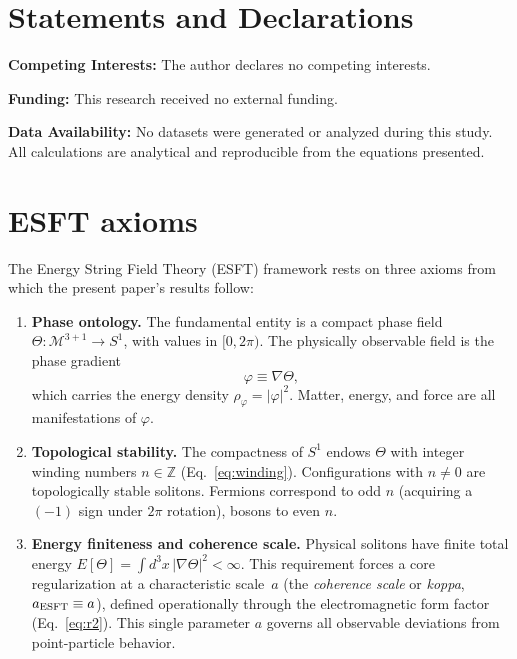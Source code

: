﻿\documentclass[a4paper,12pt]{article}
\begin{document}
\section*{Statements and Declarations}

\noindent\textbf{Competing Interests:} The author declares no competing interests.

\noindent\textbf{Funding:} This research received no external funding.

\noindent\textbf{Data Availability:} No datasets were generated or analyzed
during this study. All calculations are analytical and reproducible from
the equations presented.

\appendix
\section{ESFT axioms}
\label{app:esft}

The Energy String Field Theory (ESFT) framework
rests on three axioms from which the present
paper's results follow:

\begin{enumerate}
  \item[\textbf{A1.}] \textbf{Phase ontology.}
    The fundamental entity is a compact phase field
    $\Theta:\mathcal{M}^{3+1}\to S^1$, with values in $[0,2\pi)$.
    The physically observable field is the phase gradient
    \begin{equation}
      \varphi \equiv \nabla\Theta,
      \label{eq:esft_phi}
    \end{equation}
    which carries the energy density $\rho_\varphi = |\varphi|^2$.
    Matter, energy, and force are all manifestations of $\varphi$.

  \item[\textbf{A2.}] \textbf{Topological stability.}
    The compactness of $S^1$ endows $\Theta$ with integer winding
    numbers $n\in\mathbb{Z}$ (Eq.~\eqref{eq:winding}).  Configurations
    with $n\neq 0$ are topologically stable solitons.  Fermions
    correspond to odd $n$ (acquiring a $(-1)$ sign under $2\pi$
    rotation), bosons to even $n$.

  \item[\textbf{A3.}] \textbf{Energy finiteness and coherence scale.}
    Physical solitons have finite total energy
    $E[\Theta]=\int d^3x\,|\nabla\Theta|^2 < \infty$.  This
    requirement forces a core regularization at a characteristic
    scale~$a$ (the \emph{coherence scale} or \emph{koppa},
    $a_{\rm ESFT}\equiv a$),
    defined operationally through the electromagnetic form factor
    (Eq.~\eqref{eq:r2}).  This single parameter $a$ governs all
    observable deviations from point-particle behavior.
\end{enumerate}
\end{document}
